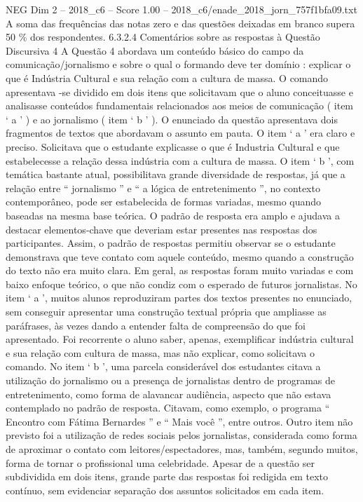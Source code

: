 \begin{textsample}{NEG Dim 2 – 2018\_c6 – Score 1.00 – 2018\_c6/enade\_2018\_jorn\_757f1bfa09.txt}
A soma das frequências das notas zero e das questões deixadas em branco supera 50 \% dos respondentes. 6.3.2.4 Comentários sobre as respostas à Questão Discursiva 4 A Questão 4 abordava um conteúdo básico do campo da comunicação/jornalismo e sobre o qual o formando deve ter domínio : explicar o que é Indústria Cultural e sua relação com a cultura de massa.
O comando apresentava -se dividido em dois itens que solicitavam que o aluno conceituasse e analisasse conteúdos fundamentais relacionados aos meios de comunicação ( item ‘ a ’ ) e ao jornalismo ( item ‘ b ’ ).
O enunciado da questão apresentava dois fragmentos de textos que abordavam o assunto em pauta.
O item ‘ a ’ era claro e preciso.
Solicitava que o estudante explicasse o que é Industria Cultural e que estabelecesse a relação dessa indústria com a cultura de massa.
O item ‘ b ’, com temática bastante atual, possibilitava grande diversidade de respostas, já que a relação entre “ jornalismo ” e “ a lógica de entretenimento ”, no contexto contemporâneo, pode ser estabelecida de formas variadas, mesmo quando baseadas na mesma base teórica.
O padrão de resposta era amplo e ajudava a destacar elementos-chave que deveriam estar presentes nas respostas dos participantes.
Assim, o padrão de respostas permitiu observar se o estudante demonstrava que teve contato com aquele conteúdo, mesmo quando a construção do texto não era muito clara.
Em geral, as respostas foram muito variadas e com baixo enfoque teórico, o que não condiz com o esperado de futuros jornalistas.
No item ‘ a ’, muitos alunos reproduziram partes dos textos presentes no enunciado, sem conseguir apresentar uma construção textual própria que ampliasse as paráfrases, às vezes dando a entender falta de compreensão do que foi apresentado.
Foi recorrente o aluno saber, apenas, exemplificar indústria cultural e sua relação com cultura de massa, mas não explicar, como solicitava o comando.
No item ‘ b ’, uma parcela considerável dos estudantes citava a utilização do jornalismo ou a presença de jornalistas dentro de programas de entretenimento, como forma de alavancar audiência, aspecto que não estava contemplado no padrão de resposta.
Citavam, como exemplo, o programa “ Encontro com Fátima Bernardes ” e “ Mais você ”, entre outros.
Outro item não previsto foi a utilização de redes sociais pelos jornalistas, considerada como forma de aproximar o contato com leitores/espectadores, mas, também, segundo muitos, forma de tornar o profissional uma celebridade.
Apesar de a questão ser subdividida em dois itens, grande parte das respostas foi redigida em texto contínuo, sem evidenciar separação dos assuntos solicitados em cada item.

\end{textsample}
